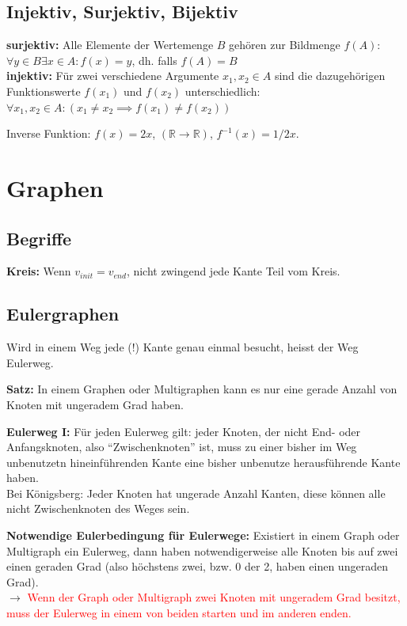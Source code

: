 \documentclass[8pt,landscape]{scrartcl}
\begin{document}
\begin{multicols}{3}
\subsection{Injektiv, Surjektiv, Bijektiv}
\textbf{surjektiv:} Alle Elemente der Wertemenge $B$ gehören zur Bildmenge $f(A)$:\\
$\forall y \in B \exists x \in A : f(x) = y$, dh. falls $f(A) = B$\\
\textbf{injektiv:} F\"ur zwei verschiedene Argumente $x_1, x_2 \in A$ sind die dazugeh\"origen Funktionswerte $f(x_1)$ und $f(x_2)$ unterschiedlich:\\
$\forall x_1, x_2 \in A : (x_1 \not = x_2 \implies f(x_1) \not = f(x_2))$

Inverse Funktion: $f(x) = 2x$, $(\mathbb{R} \rightarrow \mathbb{R})$, $f^{-1}(x) = 1/2 x$.





\section{Graphen}
\subsection{Begriffe}
\textbf{Kreis:} Wenn $v_{init} = v_{end}$, nicht zwingend jede Kante Teil vom Kreis.

\subsection{Eulergraphen}
Wird in einem Weg jede (!) Kante genau einmal besucht, heisst der Weg Eulerweg.

\textbf{Satz:} In einem Graphen oder Multigraphen kann es nur eine gerade Anzahl von Knoten mit ungeradem Grad haben.

\textbf{Eulerweg I:} F\"ur jeden Eulerweg gilt: jeder Knoten, der nicht End- oder Anfangsknoten, also ``Zwischenknoten'' ist, muss zu einer bisher im Weg unbenutzetn hineinf\"uhrenden Kante eine bisher unbenutze herausf\"uhrende Kante haben.\\
Bei K\"onigsberg: Jeder Knoten hat ungerade Anzahl Kanten, diese k\"onnen alle nicht Zwischenknoten des Weges sein.

\textbf{Notwendige Eulerbedingung f\"ur Eulerwege:} Existiert in einem Graph oder Multigraph ein Eulerweg, dann haben notwendigerweise alle Knoten bis auf zwei einen geraden Grad (also h\"ochstens zwei, bzw. 0 der 2, haben einen ungeraden Grad).\\
$\rightarrow$ \textcolor{red}{Wenn der Graph oder Multigraph zwei Knoten mit ungeradem Grad besitzt, muss der Eulerweg in einem von beiden starten und im anderen enden.}


\end{multicols}
\end{document}
